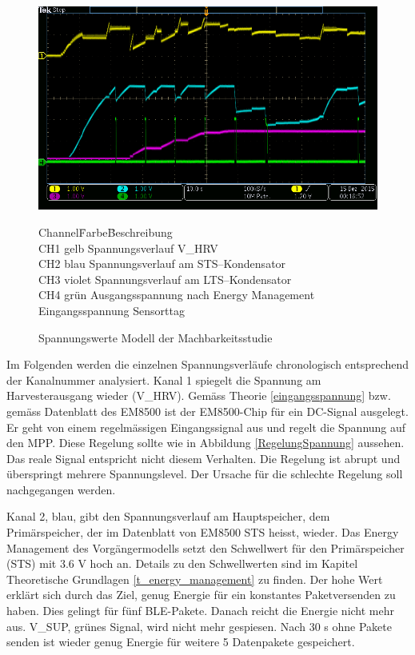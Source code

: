 \begin{figure}[ht]
    \includegraphics[width=1.0\textwidth]{3Vorgehen/imag/messungPA.png}
    \caption{Spannungswerte Modell der Machbarkeitsstudie}\label{spannungMachbarkeit} 
\begin{tabbing}
    Channel\quad\= Farbe\quad\= Beschreibung\\[0.8ex]
    CH1\> gelb\> Spannungsverlauf V\_HRV\\
    CH2\> blau\> Spannungsverlauf am STS--Kondensator\\
    CH3\> violet\> Spannungsverlauf am LTS--Kondensator\\
    CH4\> grün\> Ausgangsspannung nach Energy Management\\
     \>  \>      Eingangsspannung Sensorttag
\end{tabbing}    
\end{figure}

Im Folgenden werden die einzelnen Spannungsverläufe chronologisch entsprechend der Kanalnummer analysiert. Kanal 1 spiegelt die Spannung am Harvesterausgang wieder (V\_HRV). Gemäss Theorie \ref{eingangsspannung} bzw. gemäss Datenblatt des EM8500 ist der EM8500-Chip für ein DC-Signal ausgelegt. Er geht von einem regelmässigen Eingangssignal aus und regelt die Spannung auf den MPP. Diese Regelung sollte wie in Abbildung \ref{RegelungSpannung} aussehen. Das reale Signal entspricht nicht diesem Verhalten. Die Regelung ist abrupt und überspringt mehrere Spannungslevel. Der Ursache für die schlechte Regelung soll nachgegangen werden.

Kanal 2, blau, gibt den Spannungsverlauf am Hauptspeicher, dem Primärspeicher, der im Datenblatt von EM8500 STS heisst, wieder. Das Energy Management des Vorgängermodells setzt den Schwellwert für den Primärspeicher (STS) mit 3.6 V hoch an. Details zu den Schwellwerten sind im Kapitel Theoretische Grundlagen \ref{t_energy_management} zu finden. Der hohe Wert erklärt sich durch das Ziel, genug Energie für ein konstantes Paketversenden zu haben. Dies gelingt für fünf BLE-Pakete. Danach reicht die Energie nicht mehr aus. V\_SUP, grünes Signal, wird nicht mehr gespiesen. Nach 30 s ohne Pakete senden ist wieder genug Energie für weitere 5 Datenpakete gespeichert.

